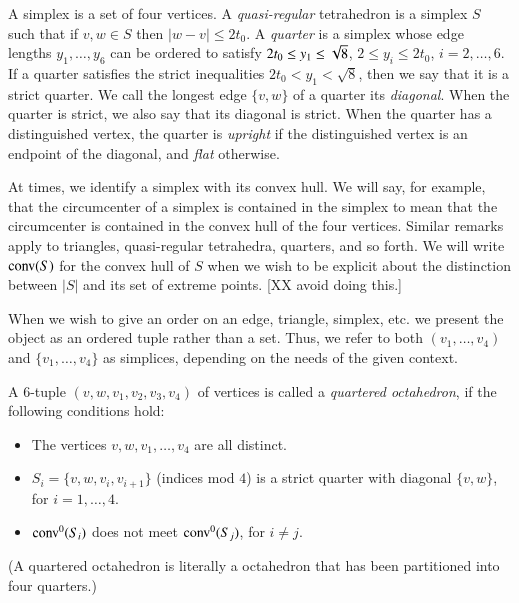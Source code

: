 \begin{definition}
A  simplex is a set of four
vertices.
A {\it quasi-regular\/} tetrahedron is a simplex $S$ such that if
$v,w\in S$ then $|w-v|\le 2t_0$. A {\it quarter\/} is a simplex
whose edge lengths $y_1,\ldots,y_6$ can be ordered to satisfy
$2t_0\le y_1\le\sqrt8$, $2\le y_i\le 2t_0$, $i=2,\ldots,6$. If a
quarter satisfies the strict inequalities $2t_0< y_1< \sqrt8$,
then we say that it is a strict quarter. We call the longest edge
$\{v,w\}$ of a quarter its {\it {} diagonal\/}. When
the quarter is strict, we also say that its diagonal is strict.
When the quarter has a distinguished vertex, the quarter is {\it
upright\/} if the distinguished vertex is an endpoint of the
diagonal, and {\it flat\/} otherwise.
\end{definition}
 
 
 


At times, we identify a simplex with its convex hull. We will say,
for example, that the circumcenter of a simplex is contained in
the simplex to mean that the circumcenter is contained in the
convex hull of the four vertices.  Similar remarks apply to
triangles, quasi-regular tetrahedra, quarters, and so forth.  We
will write ${\operatorname{conv}}(S)$ for the convex hull of $S$ when we wish to be
explicit about the distinction between $|S|$ and its set of
extreme points.  [XX avoid doing this.]

When we wish to give an order on an edge, triangle, simplex, etc.
we present the object as an ordered tuple rather than a set. Thus,
we refer to both $(v_1,\ldots,v_4)$ and $\{v_1,\ldots,v_4\}$ as
simplices, depending on the needs of the given context.



\begin{definition}  A $6$-tuple $(v,w,v_1,v_2,v_3,v_4)$ of vertices is
called a {\it quartered  octahedron}, if the
following conditions hold:
    \begin{itemize}
    \item The vertices $v,w,v_1,\ldots,v_4$ are all distinct.
    \item $S_i = \{v,w,v_i,v_{i+1}\}$ (indices mod $4$) is a
    strict quarter with diagonal $\{v,w\}$, for $i=1,\ldots,4$.
    \item ${\operatorname{conv}}^0(S_i)$ does not meet ${\operatorname{conv}}^0(S_j)$, for $i\ne j$.
    \end{itemize}
(A quartered octahedron is literally a octahedron that has been
partitioned into four quarters.)
\end{definition}

